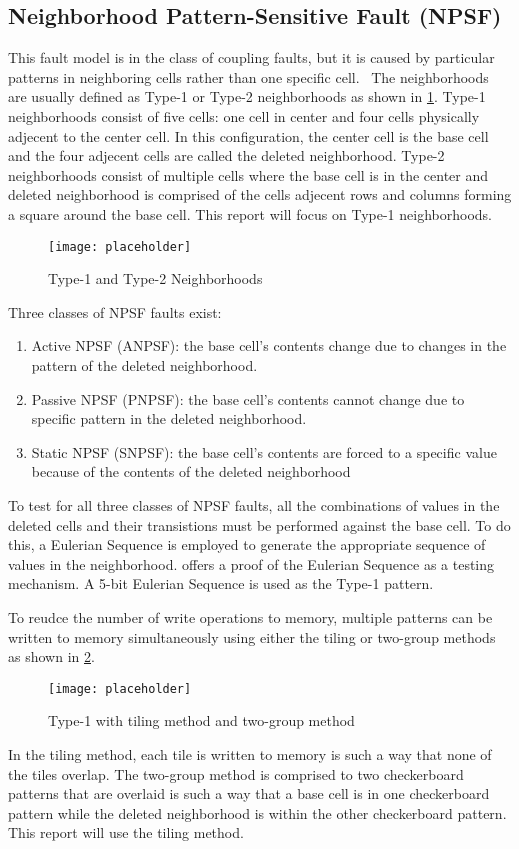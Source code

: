 \subsection{Neighborhood Pattern-Sensitive Fault (NPSF)}
This fault model is in the class of coupling faults, but it is caused by particular patterns in neighboring cells rather than one specific cell.  The neighborhoods are usually defined as Type-1 or Type-2 neighborhoods \cite{1047051} as shown in \ref{fig:npsftypes}.  Type-1 neighborhoods consist of five cells: one cell in center and four cells physically adjecent to the center cell.  In this configuration, the center cell is the base cell and the four adjecent cells are called the deleted neighborhood.  Type-2 neighborhoods consist of multiple cells where the base cell is in the center and deleted neighborhood is comprised of the cells adjecent rows and columns forming a square around the base cell.  This report will focus on Type-1 neighborhoods.

\begin{figure}[h]
  \centering
  \texttt{[image: placeholder]}
  \caption{Type-1 and Type-2 Neighborhoods}
  \label{fig:npsftypes}
\end{figure}

Three classes of NPSF faults exist:
\begin{enumerate}
  \item Active NPSF (ANPSF): the base cell's contents change due to changes in the pattern of the deleted neighborhood.
  \item Passive NPSF (PNPSF): the base cell's contents cannot change due to specific pattern in the deleted neighborhood.
  \item Static NPSF (SNPSF): the base cell's contents are forced to a specific value because of the contents of the deleted neighborhood
\end{enumerate}

To test for all three classes of NPSF faults, all the combinations of values in the deleted cells and their transistions must be performed against the base cell.  To do this, a Eulerian Sequence is employed to generate the appropriate sequence of values in the neighborhood.  \cite{1675556} offers a proof of the Eulerian Sequence as a testing mechanism.  A 5-bit Eulerian Sequence is used as the Type-1 pattern.

To reudce the number of write operations to memory, multiple patterns can be written to memory simultaneously using either the tiling or two-group methods as shown in \ref{fig:type1methods}.

\begin{figure}[h]
  \centering
  \texttt{[image: placeholder]}
  \caption{Type-1 with tiling method and two-group method}
  \label{fig:type1methods}
\end{figure}

In the tiling method, each tile is written to memory is such a way that none of the tiles overlap.  The two-group method is comprised to two checkerboard patterns that are overlaid is such a way that a base cell is in one checkerboard pattern while the deleted neighborhood is within the other checkerboard pattern.  This report will use the tiling method.
